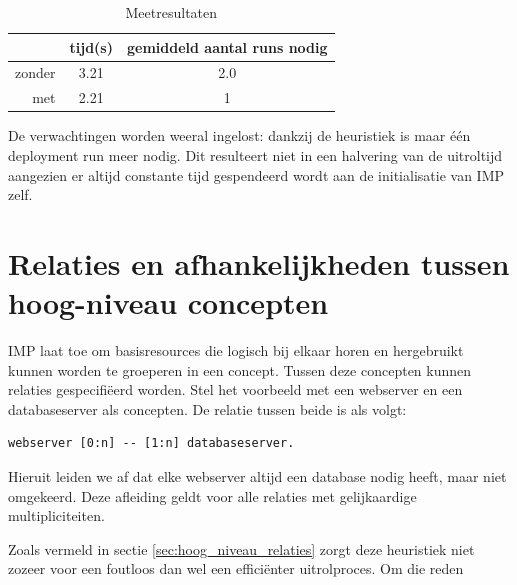 \begin{table}
  \begin{center}
  \label{table:service_package_dep}
  \begin{tabular}{ r | c | c }
            & tijd(s)   & gemiddeld aantal runs nodig \\ \hline
    zonder  & 3.21      & 2.0 \\ \hline
    met     & 2.21      & 1 \\
  \end{tabular}
  \caption{Meetresultaten}
  \end{center}
\end{table}


De verwachtingen worden weeral ingelost: dankzij de heuristiek is maar \'e\'en deployment run meer nodig.
Dit resulteert niet in een halvering van de uitroltijd aangezien er altijd constante tijd gespendeerd wordt aan de initialisatie van IMP zelf.

\section{Relaties en afhankelijkheden tussen hoog-niveau concepten}

IMP laat toe om basisresources die logisch bij elkaar horen en hergebruikt kunnen worden te groeperen in een concept.
Tussen deze concepten kunnen relaties gespecifi\"eerd worden.
Stel het voorbeeld met een webserver en een databaseserver als concepten.
De relatie tussen beide is als volgt:
\begin{lstlisting}
webserver [0:n] -- [1:n] databaseserver.
\end{lstlisting}
Hieruit leiden we af dat elke webserver altijd een database nodig heeft, maar niet omgekeerd.
Deze afleiding geldt voor alle relaties met gelijkaardige multipliciteiten.

Zoals vermeld in sectie \ref{sec:hoog_niveau_relaties} zorgt deze heuristiek niet zozeer voor een foutloos dan wel een effici\"enter uitrolproces.
Om die reden  
%


